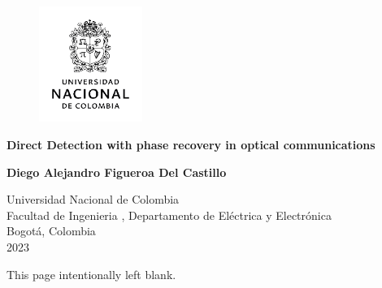 
\begin{titlepage}
    \begin{center}
          
      	\begin{figure}[ht]
      		\includegraphics[width=0.3\textwidth]{images/preliminaries/EscudoUNAL.png}
      		\centering
      	\end{figure}
            
        \vspace{3.5cm}
            
        \LARGE{\textbf{Direct Detection with phase recovery in optical communications }}
        
        \vspace{3.5cm}
        \large{\textbf{Diego Alejandro Figueroa Del Castillo}}
        \vfill
        
        
        \normalsize{Universidad Nacional de Colombia\\
					Facultad de Ingenieria , Departamento de Eléctrica y Electrónica\\
					Bogotá, Colombia\\
					2023}
            
    \end{center}
\end{titlepage}
\clearpage\begingroup
\mbox{}
                \vspace*{\fill}
                \begin{center}
                  This page intentionally left blank.
                \end{center}
                \vspace{\fill}
                \pagestyle{empty}\cleardoublepage\endgroup


\makeatletter
              \def\cleardoublepage{\clearpage\if@twoside \ifodd\c@page\else
               \begingroup
                \mbox{}
                \vspace*{\fill}
                \begin{center}
                  This page intentionally left blank.
                \end{center}
                \vspace{\fill}
                \thispagestyle{plain}
\newpage
                \if@twocolumn\mbox{}\newpage\fi
               \endgroup\fi\fi}
              \makeatother
